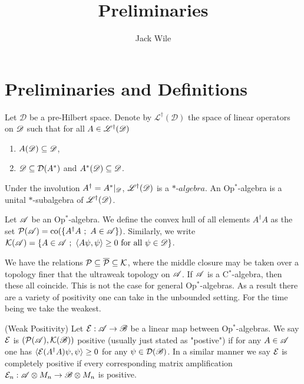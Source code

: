 \documentclass[../main.tex]{subfiles}
\title{Preliminaries}
\author{Jack Wile}
\date{}
\begin{document}
\section*{Preliminaries and Definitions}

\begin{definition}
	Let $\mathscr{D}$ be a pre-Hilbert space. Denote by $\mathscr{L}^\dagger(\mathscr{D})$
	the space of linear operators on $\mathscr{D}$ such that for all $A \in \mathscr{L}^\dagger(\mathscr{D})$ 

	\begin{enumerate}
		\item $A(\mathscr{D}) \subseteq \mathscr{D}$,
		\item $\mathscr{D} \subseteq \mathcal{D}(A^*)$ and $A^*(\mathscr{D}) \subseteq \mathscr{D}$.
	\end{enumerate}

	\noindent Under the involution $A^\dagger = A^*|_{\mathscr{D}}$, $\mathscr{L}^\dagger(\mathscr{D})$ is a $*\text{-}algebra$. 
	An Op$^*$-algebra is a unital $*$-subalgebra of $\mathscr{L}^\dagger(\mathscr{D})$.
\end{definition}

\begin{definition}
	Let $\mathscr{A}$ be an Op$^*$-algebra. We define the convex hull of all elements $A^\dagger A$ as the set
	$\mathcal{P}(\mathscr{A}) = \text{co}(\{A^\dagger A \ ; \ A \in \mathscr{A}\})$. Similarly, we write
	$\mc{K}(\ms{A}) = \{A \in \ms{A} \ ; \ \ip{A\psi}{\psi} \ge 0 \text{ for all } \psi \in \ms{D}\}$.


\end{definition}

We have the relations $\mathcal{P} \subseteq \overline{\mathcal{P}} \subseteq \mathcal{K}$, where the middle closure may be taken over a
topology finer that the ultraweak topology on $\mathscr{A}$. If $\mathscr{A}$ is a C$^*$-algebra, then these all coincide. This is not 
the case for general Op$^*$-algebras. As a result there are a variety of positivity one can take in the unbounded setting. 
For the time being we take the weakest.


\begin{definition} (Weak Positivity) Let $\mathcal{E}: \mathscr{A} \to \mathscr{B}$ be a linear map between Op$^*$-algebras. 
	We say $\mathcal{E}$ is $(\mathcal{P}(\mathscr{A}), \mathcal{K}(\mathscr{B}))$ positive (usually just stated as "postive")
	if for any $A \in \mathscr{A}$ one has 
	$\langle \mathcal{E}(A^\dagger A)\psi, \psi \rangle \ge 0$ for any $\psi \in \mathcal{D}(\mathscr{B})$. In a similar manner 
	we say $\mathcal{E}$ is completely positive if every corresponding matrix amplification
	$\mathcal{E}_n:\mathscr{A} \otimes M_n \to \mathscr{B} \otimes M_n$ is positive. 
\end{definition}
\end{document}
